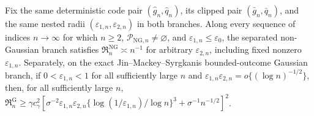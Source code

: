 Fix the same deterministic code pair \((\widehat g_n,\widehat q_n)\), its clipped pair \((\bar g_n,\bar q_n)\), and the same nested radii \((\varepsilon_{1,n},\varepsilon_{2,n})\) in both branches. Along every sequence of indices \(n\to\infty\) for which \(n\ge2\), \(\mathcal P_{\mathrm{NG},n}\neq\varnothing\), and \(\varepsilon_{1,n}\le\varepsilon_0\), the separated non-Gaussian branch satisfies \(\mathfrak R_n^{\mathrm{NG}}\asymp n^{-1}\) for arbitrary \(\varepsilon_{2,n}\), including fixed nonzero \(\varepsilon_{1,n}\). Separately, on the exact Jin--Mackey--Syrgkanis bounded-outcome Gaussian branch, if \(0<\varepsilon_{1,n}<1\) for all sufficiently large \(n\) and \(\varepsilon_{1,n}\varepsilon_{2,n}=o\{(\log n)^{-1/2}\}\), then, for all sufficiently large \(n\), \(\mathfrak R_n^{\mathrm G}\ge\gamma c_{\gamma}^2[\sigma^{-2}\varepsilon_{1,n}\varepsilon_{2,n}\{\log(1/\varepsilon_{1,n})/\log n\}^3+\sigma^{-1}n^{-1/2}]^2\).